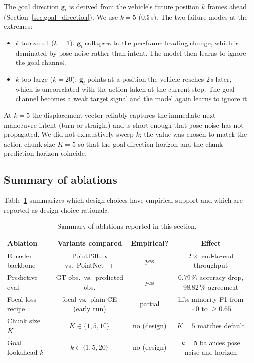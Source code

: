 \documentclass[sensors,article,submit,pdftex,moreauthors]{Definitions/mdpi}
\begin{document}
The goal direction $\mathbf{g}_t$ is derived from the vehicle's future position $k$ frames ahead (Section~\ref{sec:goal_direction}). We use $k{=}5$ (0.5\,s). The two failure modes at the extremes:
\begin{itemize}
    \item $k$ too small ($k{=}1$): $\mathbf{g}_t$ collapses to the per-frame heading change, which is dominated by pose noise rather than intent. The model then learns to ignore the goal channel.
    \item $k$ too large ($k{=}20$): $\mathbf{g}_t$ points at a position the vehicle reaches 2\,s later, which is uncorrelated with the action taken at the current step. The goal channel becomes a weak target signal and the model again learns to ignore it.
\end{itemize}
At $k{=}5$ the displacement vector reliably captures the immediate next-manoeuvre intent (turn or straight) and is short enough that pose noise has not propagated. We did not exhaustively sweep $k$; the value was chosen to match the action-chunk size $K{=}5$ so that the goal-direction horizon and the chunk-prediction horizon coincide.

\subsection{Summary of ablations}

Table~\ref{tab:ablation_summary} summarizes which design choices have empirical support and which are reported as design-choice rationale.

\begin{table}[H]
\caption{Summary of ablations reported in this section.}
\label{tab:ablation_summary}
\centering
\footnotesize
\begin{tabular}{lccc}
\toprule
Ablation & Variants compared & Empirical? & Effect \\
\midrule
Encoder backbone   & PointPillars vs.\ PointNet++ & yes & $2{\times}$ end-to-end throughput \\
Predictive eval    & GT obs.\ vs.\ predicted obs. & yes & 0.79\,\% accuracy drop, 98.82\,\% agreement \\
Focal-loss recipe  & focal vs.\ plain CE (early run) & partial & lifts minority F1 from $\sim$0 to $\geq 0.65$ \\
Chunk size $K$     & $K{\in}\{1,5,10\}$           & no (design)  & $K{=}5$ matches \cite{zhao2023act} default \\
Goal lookahead $k$ & $k{\in}\{1,5,20\}$           & no (design)  & $k{=}5$ balances pose noise and horizon \\
\bottomrule
\end{tabular}
\end{table}
\end{document}

